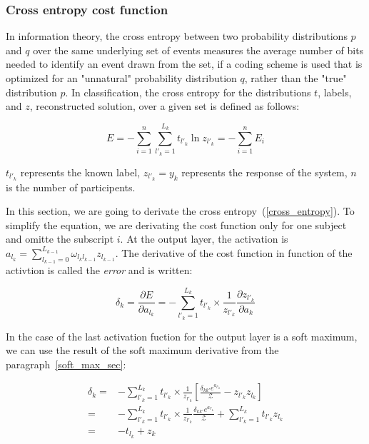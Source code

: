 \documentclass[final, paper=letter,5p,times,twocolumn]{elsarticle}
\begin{document}
\subsubsection{Cross entropy cost function}
\label{Cross_entropy_cost_function_sec}

In information theory, the cross entropy between two probability distributions $p$ and $q$ over the same underlying set of events measures the average number of bits needed to identify an event drawn from the set, if a coding scheme is used that is optimized for an "unnatural" probability distribution $q$, rather than the "true" distribution $p$. In classification, the cross entropy for the distributions $t$, labels, and $z$, reconstructed solution, over a given set is defined as follows:

\begin{equation}
  E = - \sum_{i = 1}^{n}\sum_{l'_{k} = 1}^{L_{k}} t_{l'_{k}} \ln z_{l'_{k}} =  - \sum_{i = 1}^{n} E_{i}
  \label{cross_entropy}
\end{equation}

$t_{l'_{k}}$ represents the known label, $z_{l'_{k}} = y_{k}$ represents the response of the system, $n$ is the number of participents. 

In this section, we are going to derivate the cross entropy~(\ref{cross_entropy}). To simplify the equation, we are derivating the cost function only for one subject and omitte the subscript $i$. At the output layer, the activation is $a_{l_{k}} = \sum_{l_{k-1} = 0}^{L_{k-1}} \omega_{l_{k}l_{k-1}} z_{l_{k-1}}$. The derivative of the cost function in function of the activtion is called the {\it error} and is written:

\begin{equation}
  \delta_{k} = \frac{\partial E}{\partial a_{l_{k}}} = - \sum_{l'_{k} = 1}^{L_{k}} t_{l'_{k}} \times \frac{1}{z_{l'_{k}}} \frac{\partial z_{l'_{k}}}{\partial a_{k}}
  \label{cost_function_error}
\end{equation}

In the case of the last activation fuction for the output layer is a soft maximum, we can use the result of the soft maximum derivative from the paragraph~\ref{soft_max_sec}:

\begin{equation*}
  \begin{split}
    \delta_{k} = & - \sum_{l'_{k} = 1}^{L_{k}} t_{l'_{k}} \times \frac{1}{z_{l'_{k}}} \left \lbrack  \frac{\delta_{kk'} e^{a_{l'_{k}}}}{\mathcal{Z}} - z_{l'_{k}}z_{l_{k}} \right \rbrack \\
    = & - \sum_{l'_{k} = 1}^{L_{k}} t_{l'_{k}} \times \frac{1}{z_{l'_{k}}} \frac{\delta_{kk'} e^{a_{l'_{k}}}}{\mathcal{Z}} +  \sum_{l'_{k} = 1}^{L_{k}} t_{l'_{k}} z_{l_{k}} \\
    = & - t_{l_{k}} +  z_{k} \\
  \end{split}
\end{equation*}
\end{document}
